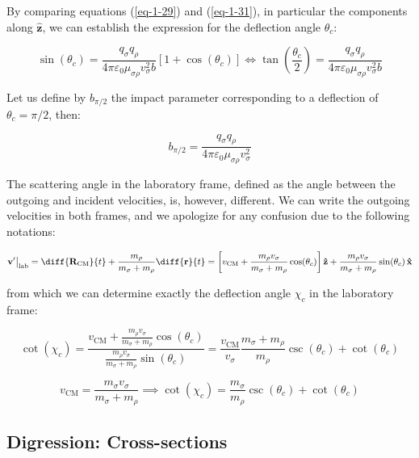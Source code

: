 By comparing equations (\ref{eq-1-29}) and (\ref{eq-1-31}), in particular the components along $\mathbf{\hat{z}}$, we can establish the expression for the deflection angle $\theta_c$:

\begin{equation}
    \label{eq-1-32}
    \sin(\theta_c)=\frac{q_\sigma q_\rho}{4\pi\varepsilon_0\mu_{\sigma\rho}v_\sigma^2b}\left[1+\cos(\theta_c)\right]\Longleftrightarrow\tan\left(\frac{\theta_c}{2}\right)=\frac{q_\sigma q_\rho}{4\pi\varepsilon_0\mu_{\sigma\rho}v_\sigma^2b}
\end{equation}

Let us define by $b_{\pi/2}$ the impact parameter corresponding to a deflection of $\theta_c=\pi/2$, then:

\begin{equation}
    b_{\pi/2}=\frac{q_\sigma q_\rho}{4\pi\varepsilon_0\mu_{\sigma\rho}v_\sigma^2}
\end{equation}

The scattering angle in the laboratory frame, defined as the angle between the outgoing and incident velocities, is, however, different. We can write the outgoing velocities in both frames, and we apologize for any confusion due to the following notations:

\begin{equation}
    \mathbf{v'}\bigr|_\text{lab}=\diff{\mathbf{R}_\text{CM}}{t}+\frac{m_\rho}{m_\sigma+m_\rho}\diff{\mathbf{r}}{t}=\left[v_\text{CM}+\frac{m_\rho v_\sigma}{m_\sigma+m_\rho}\cos(\theta_c)\right]\mathbf{\hat{z}}+\frac{m_\rho v_\sigma}{m_\sigma+m_\rho}\sin(\theta_c)\,\mathbf{\hat{x}}
\end{equation}

from which we can determine exactly the deflection angle $\chi_c$ in the laboratory frame:

\begin{equation}
    \cot(\chi_c)=\frac{v_\text{CM}+\frac{m_\rho v_\sigma}{m_\sigma+m_\rho}\cos(\theta_c)}{\frac{m_\rho v_\sigma}{m_\sigma+m_\rho}\sin(\theta_c)}=\frac{v_\text{CM}}{v_\sigma}\frac{m_\sigma+m_\rho}{m_\rho}\csc(\theta_c)+\cot(\theta_c)
\end{equation}

\begin{equation}
    v_\text{CM}=\frac{m_\sigma v_\sigma}{m_\sigma+m_\rho}\implies\cot(\chi_c)=\frac{m_\sigma}{m_\rho}\csc(\theta_c)+\cot(\theta_c)
\end{equation}

\subsection{Digression: Cross-sections}

